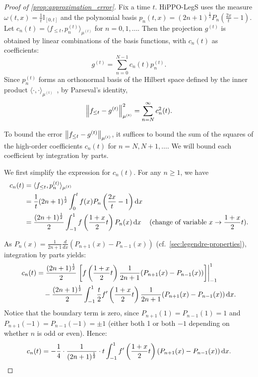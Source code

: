 \documentclass[../hippo.tex]{subfiles}
\begin{document}
\begin{proof}[Proof of \cref{prop:approximation_error}]%
  Fix a time $t$.
  HiPPO-LegS uses the measure $\omega(t, x) = \frac{1}{t} \mathbb{I}_{[0, t]}$ and the
  polynomial basis $p_n(t, x) = (2n+1)^{\frac{1}{2}} P_n \left( \frac{2x}{t} - 1 \right)$.
  Let $c_n(t) = \langle f_{\leq t}, p_n^{(t)} \rangle_{\mu^{(t)}}$ for $n = 0, 1, \dots$.
  Then the projection $g^{(t)}$ is obtained by linear combinations of the basis
  functions, with $c_n(t)$ as coefficients:
  \begin{equation*}
    g^{(t)}= \sum_{n=0}^{N - 1} c_n(t) p_n^{(t)}.
  \end{equation*}
  Since $p_n^{(t)}$ forms an orthonormal basis of the Hilbert space defined by
  the inner product $\langle \cdot, \cdot \rangle_{\mu^{(t)}}$~\citep{chihara}, by Parseval's
  identity,
  \begin{equation*}
    \left\|{f_{\leq t} - g^{(t)}}\right\|^2_{\mu^{(t)}} = \sum_{n=N}^{\infty} c_n^2(t).
  \end{equation*}

  To bound the error $\left\|{f_{\leq t} - g^{(t)}}\right\|_{\mu^{(t)}}$, it suffices to
  bound the sum of the squares of the high-order coefficients $c_n(t)$ for
  $n = N, N+1, \dots$.
  We will bound each coefficient by integration by parts.

  We first simplify the expression for $c_n(t)$.
  For any $n \geq 1$, we have
  \begin{align*}
    c_n(t)
    &= \langle f_{\leq t}, p_n^{(t)} \rangle_{\mu^{(t)}} \\
    &= \frac{1}{t} (2n+1)^{\frac{1}{2}} \int_{0}^{t} f(x) P_n\left(\frac{2x}{t} - 1\right) \mathop{}\!\mathrm{d} x \\
    &= \frac{(2n+1)^{\frac{1}{2}}}{2} \int_{-1}^{1} f \left( \frac{1+x}{2} t \right) P_n(x) \mathop{}\!\mathrm{d} x  & \text{(change of variable $x \to \frac{1+x}{2} t$)}.
  \end{align*}

  As $P_n(x) = \frac{1}{2n+1} \frac{d}{dx} (P_{n+1}(x) - P_{n-1}(x))$ (cf.\
  \cref{sec:legendre-properties}), integration by parts yields:
  \begin{align*}
    c_n(t)
    &= \frac{(2n+1)^{\frac{1}{2}}}{2} \left. \left[ f \left( \frac{1+x}{2} t \right) \frac{1}{2n+1} (P_{n+1}(x) - P_{n-1}(x)) \right] \right|_{-1}^1 \\
    &\quad - \frac{(2n+1)^{\frac{1}{2}}}{2} \int_{-1}^{1} \frac{t}{2} f' \left( \frac{1+x}{2} t \right) \frac{1}{2n+1} (P_{n+1}(x) - P_{n-1}(x)) \mathop{}\!\mathrm{d} x.
  \end{align*}
  Notice that the boundary term is zero, since
  $P_{n+1}(1) = P_{n-1}(1) = 1$ and $P_{n+1}(-1) = P_{n-1}(-1) = \pm 1$ (either
  both 1 or both $-1$ depending on whether $n$ is odd or even).
  Hence:
  \begin{equation*}
    c_n(t) = -\frac{1}{4} \cdot \frac{1}{(2n+1)^{\frac{1}{2}}} \cdot t \int_{-1}^{1} f' \left( \frac{1+x}{2} t \right) (P_{n+1}(x) - P_{n-1}(x)) \mathop{}\!\mathrm{d} x.
  \end{equation*}


\end{proof}
\end{document}
